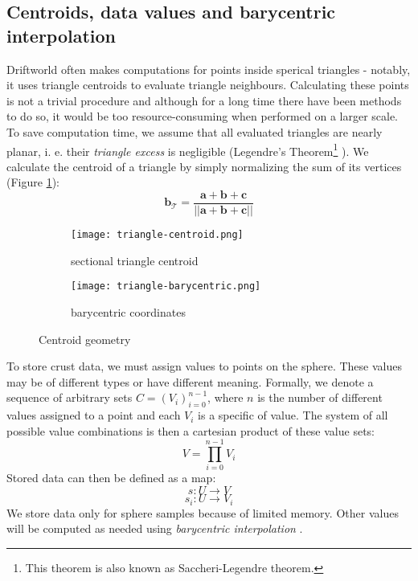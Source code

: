 \subsection{Centroids, data values and barycentric interpolation}
Driftworld often makes computations for points inside sperical triangles - notably, it uses triangle centroids to evaluate triangle neighbours. Calculating these points is not a trivial procedure and although for a long time there have been methods to do so, it would be too resource-consuming when performed on a larger scale. To save computation time, we assume that all evaluated triangles are nearly planar, i. e. their \textit{triangle excess} is negligible (Legendre's Theorem\footnote{This theorem is also known as Saccheri-Legendre theorem.} \cite{todhunter}). We calculate the centroid of a triangle by simply normalizing the sum of its vertices (Figure \ref{fig:triangle-centroid}):
$$\mathbf{b}_\mathcal{T}=\frac{\mathbf{a} + \mathbf{b} + \mathbf{c}}{||\mathbf{a} + \mathbf{b} + \mathbf{c}||}$$
\begin{figure}[ht]
\centering
\begin{subfigure}{7cm}
\texttt{[image: triangle-centroid.png]}
\caption{sectional triangle centroid}
\label{fig:triangle-centroid}
\end{subfigure}
\hspace*{1cm}
\begin{subfigure}{7cm}
\texttt{[image: triangle-barycentric.png]}
\caption{barycentric coordinates}
\label{fig:triangle-barycentric}
\end{subfigure}
\caption{Centroid geometry}
\label{fig:centroid-geometry}
\end{figure}

To store crust data, we must assign values to points on the sphere. These values may be of different types or have different meaning. Formally, we denote a sequence of arbitrary sets $C=\left(V_i\right)_{i=0}^{n-1}$, where $n$ is the number of different values assigned to a point and each $V_i$ is a specific of value. The system of all possible value combinations is then a cartesian product of these value sets:
$$V=\prod_{i=0}^{n-1}V_i$$
Stored data can then be defined as a map:
$$s: U\rightarrow V$$
$$s_i: U\rightarrow V_i$$
We store data only for sphere samples because of limited memory. Other values will be computed as needed using \textit{barycentric interpolation} \cite{scratchapixel}.\newpage

